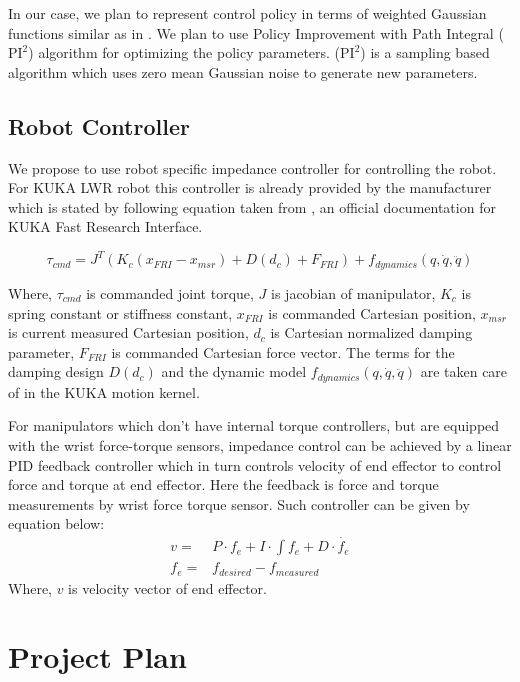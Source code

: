 \documentclass[thesis]{mas_proposal}
\begin{document}
In our case, we plan to represent control policy in terms of weighted Gaussian functions similar as in \cite{nemec2017door}. We plan to use Policy Improvement with Path Integral ($\text{PI}^{2}$) algorithm\cite{theodorou2010learning} for optimizing the policy parameters. ($\text{PI}^{2}$) is a sampling based algorithm which uses zero mean Gaussian noise to generate new parameters.    

\section{Robot Controller}

We propose to use robot specific impedance controller for controlling the robot. For KUKA LWR robot this controller is already provided by the manufacturer which is stated by following equation taken from \cite{schreiber2010fast}, an official documentation for KUKA Fast Research Interface.

\begin{equation}
\tau_{cmd} = J^{T}(K_{c}(x_{FRI} - x_{msr}) + D(d_{c}) + F_{FRI}) + f_{dynamics}(q, \dot{q}, \ddot{q})
\end{equation}

Where,
$\tau_{cmd}$ is commanded joint torque, $J$ is jacobian of manipulator, $K_{c}$ is spring constant or stiffness constant, $x_{FRI}$ is commanded Cartesian position, $x_{msr}$ is current measured Cartesian position, $d_{c}$ is Cartesian normalized damping parameter, $F_{FRI}$ is commanded Cartesian force vector. The terms for the damping design $D(d_{c})$ and the dynamic model $f_{dynamics}(q, \dot{q}, \ddot{q})$ are taken care of in the KUKA motion
kernel.   

For manipulators which don't have internal torque controllers, but are equipped with the wrist force-torque sensors, impedance control can be achieved by a linear PID feedback controller which in turn controls velocity of end effector to control force and torque at end effector. Here the feedback is force and torque measurements by wrist force torque sensor. Such controller can be given by equation below:
\begin{align}
	v =& P \cdot f_{e} + I \cdot \int f_{e} + D \cdot \dot{f_{e}} \\
	f_{e} =& f_{desired} - f_{measured}
\end{align}   
Where, $v$ is velocity vector of end effector.
\chapter{Project Plan}
\end{document}
